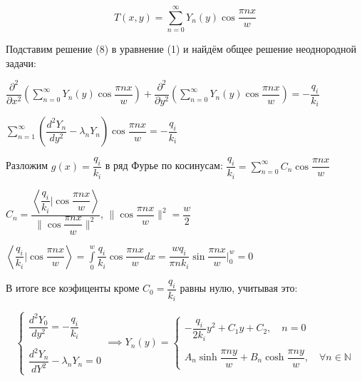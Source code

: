 \documentclass[a4paper,12pt]{article}
\begin{document}
	\begin{equation}
		T(x, y) = \displaystyle\sum\limits_{n=0}^{\infty} Y_n (y) \cos{\dfrac{\pi n x}{w}}
	\end{equation}
	  
	\quad Подставим решение (8) в уравнение (1) и найдём общее решение неоднородной задачи: 
	
	\begin{center}
		$ \dfrac{\partial^2 }{\partial x^2} \left( \displaystyle\sum\limits_{n=0}^{\infty} Y_n (y) \cos{\dfrac{\pi n x}{w}} \right) + \dfrac{\partial^2}{\partial y^2} \left(\displaystyle\sum\limits_{n=0}^{\infty} Y_n (y) \cos{\dfrac{\pi n x}{w}}\right)= -\dfrac{q_i}{k_i}$
		
		$\displaystyle\sum\limits_{n=1}^{\infty} \left( \dfrac{d^2 Y_n}{dy^2} - \lambda_n Y_n \right) \cos{\dfrac{\pi n x}{w} }= -\dfrac{q_i}{k_i}$ 
	\end{center}	
	
	\quad Разложим $g(x) = \dfrac{q_i}{k_i}$ в ряд Фурье по косинусам: $\dfrac{q_i}{k_i} = \displaystyle\sum\limits_{n=0}^{\infty} C_n \cos{\dfrac{\pi n x}{w}}$
	
	\begin{center}
		$C_n = \dfrac{\left<\dfrac{q_i}{k_i} \bigg| \cos{\dfrac{\pi n x}{w}}\right>}{\| \cos{\dfrac{\pi n x}{w}}\|^2}$, $\| \cos{\dfrac{\pi n x}{w}}\|^2 = \dfrac{w}{2}$
		
		$\left<\dfrac{q_i}{k_i}\bigg|\cos{\dfrac{\pi n x}{w}}\right> = \displaystyle\int\limits_{0}^{w} \dfrac{q_i}{k_i} \cos{\dfrac{\pi n x}{w}} dx = \dfrac{wq_i}{\pi n k_i} \sin{\dfrac{\pi n x}{w}} \bigg|_{0}^{w} = 0$
	\end{center}
	
	\quad В итоге все коэфиценты кроме $C_0 = \dfrac{q_i}{k_i}$ равны нулю, учитывая это: 
	 
	\begin{equation}
		\begin{cases}
			\dfrac{d^2 Y_0}{dy^2} = -\dfrac{q_i}{k_i} \\
			\\
			\dfrac{d^2 Y_n}{dY^2} -\lambda_n Y_n = 0
		\end{cases} \implies Y_n (y) = \begin{cases}
			-\dfrac{q_i }{2k_i} y^2 + C_1 y + C_2 , \quad n = 0 \\
			\\
			A_n \sinh{\dfrac{\pi n y}{w}}+ B_n \cosh{\dfrac{\pi n y}{w}},  \quad \forall n \in \mathbb{N}
		\end{cases}
	\end{equation}
	  
\end{document}

